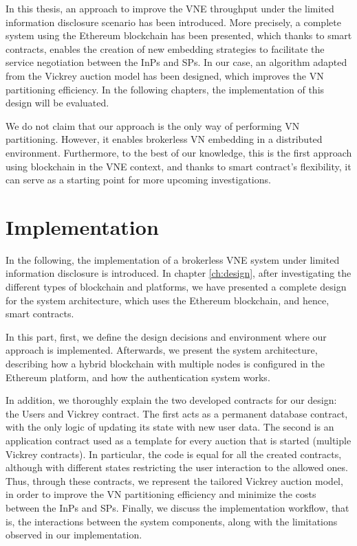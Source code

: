 In this thesis, an approach to improve the VNE throughput under the limited information disclosure scenario has been introduced. More precisely, a complete system using the Ethereum blockchain has been presented, which thanks to smart contracts, enables the creation of new embedding strategies to facilitate the service negotiation between the InPs and SPs. In our case, an algorithm adapted from the Vickrey auction model has been designed, which improves the VN partitioning efficiency. In the following chapters, the implementation of this design will be evaluated.

We do not claim that our approach is the only way of performing VN partitioning. However, it enables brokerless VN embedding in a distributed environment. Furthermore, to the best of our knowledge, this is the first approach using blockchain in the VNE context, and thanks to smart contract's flexibility, it can serve as a starting point for more upcoming investigations.

\chapter{Implementation}
\label{ch:implementation}

In the following, the implementation of a brokerless VNE system under limited information disclosure is introduced. In chapter \ref{ch:design}, after investigating the different types of blockchain and platforms, we have presented a complete design for the system architecture, which uses the Ethereum blockchain, and hence, smart contracts. 

In this part, first, we define the design decisions and environment where our approach is implemented. Afterwards, we present the system architecture, describing how a hybrid blockchain with multiple nodes is configured in the Ethereum platform, and how the authentication system works. 

In addition, we thoroughly explain the two developed contracts for our design: the Users and Vickrey contract. The first acts as a permanent database contract, with the only logic of updating its state with new user data. The second is an application contract used as a template for every auction that is started (multiple Vickrey contracts). In particular, the code is equal for all the created contracts, although with different states restricting the user interaction to the allowed ones. Thus, through these contracts, we represent the tailored Vickrey auction model, in order to improve the VN partitioning efficiency and minimize the costs between the InPs and SPs. Finally, we discuss the implementation workflow, that is, the interactions between the system components, along with the limitations observed in our implementation.

